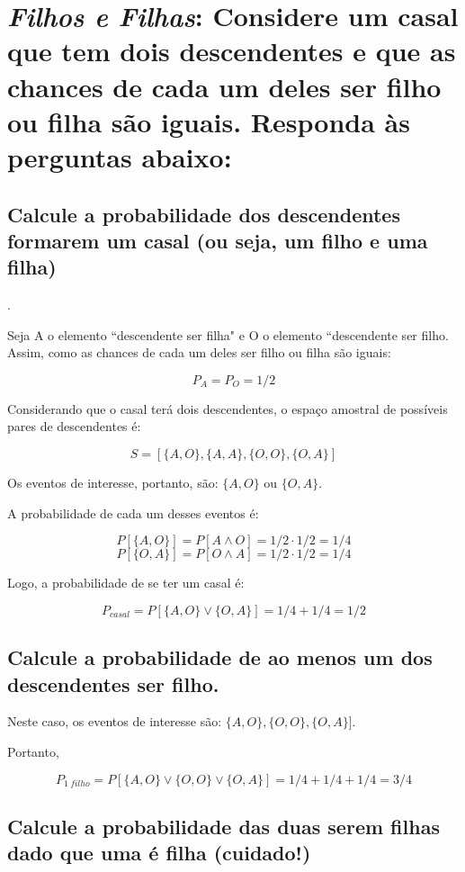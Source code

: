 \documentclass[a4paper]{article}
\begin{document}


\section{\textit{Filhos e Filhas}: Considere um casal que tem dois descendentes e que as chances de cada um deles ser filho ou filha são iguais. Responda às perguntas abaixo:}

\subsection{Calcule a probabilidade dos descendentes formarem um casal (ou seja, um filho e uma filha)}.

Seja A o elemento ``descendente ser filha" e O o elemento ``descendente ser filho. Assim, como as chances de cada um deles ser filho ou filha são iguais: 

$$P_A = P_O = 1/2$$

Considerando que o casal terá dois descendentes, o espaço amostral de possíveis pares de descendentes é: 

$$S = [\{A, O\}, \{A, A\}, \{O, O\}, \{O, A\}]$$

Os eventos de interesse, portanto, são: $\{A, O\}$ ou $\{O, A\}$.

A probabilidade de cada um desses eventos é:

$$P[\{A, O\}] = P[A \wedge	 O] = 1/2 \cdot 1/2 = 1/4$$
$$P[\{O, A\}] = P[O \wedge	 A] = 1/2 \cdot 1/2 = 1/4$$

Logo, a probabilidade de se ter um casal é:

$$P_{casal} = P[\{A, O\} \vee \{O, A\}] = 1/4 + 1/4 = 1/2$$

\subsection{Calcule a probabilidade de ao menos um dos descendentes ser filho.}

Neste caso, os eventos de interesse são: $\{A, O\}, \{O, O\}, \{O, A\}]$.

Portanto, 

$$P_{1\ filho} = P[\{A, O\} \vee \{O, O\} \vee \{O, A\}] = 1/4 + 1/4 + 1/4 = 3/4$$


\subsection{Calcule a probabilidade das duas serem filhas dado que uma é filha (cuidado!)}
\end{document}
